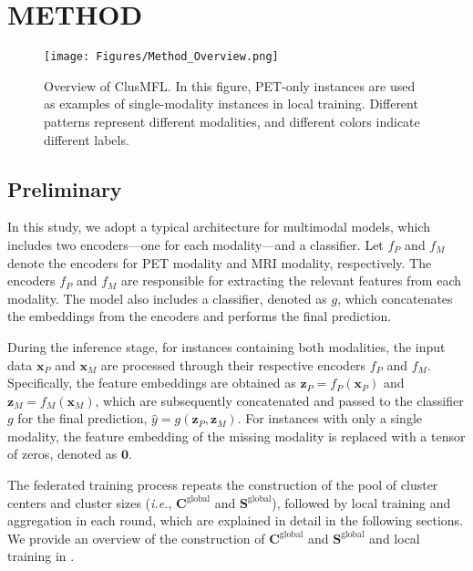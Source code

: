 \section{METHOD}
\begin{figure*}[htbp]
    \centering
    \texttt{[image: Figures/Method\_Overview.png]} %
    \caption{Overview of ClusMFL. In this figure, PET-only instances are used as examples of single-modality instances in local training. Different patterns represent different modalities, and different colors indicate different labels.}  
    \label{fig:overview}
\end{figure*}
\subsection{Preliminary}
\label{sec: preliminary}
In this study, we adopt a typical architecture for multimodal models, which includes two encoders—one for each modality—and a classifier. Let \( f_P \) and \( f_M \) denote the encoders for PET modality and MRI modality, respectively. The encoders \( f_P \) and \( f_M \) are responsible for extracting the relevant features from each modality. The model also includes a classifier, denoted as \( g \), which concatenates the embeddings from the encoders and performs the final prediction.

During the inference stage, for instances containing both modalities, the input data \( \mathbf{x}_P \) and \( \mathbf{x}_M \) are processed through their respective encoders \( f_P \) and \( f_M \). Specifically, the feature embeddings are obtained as \( \mathbf{z}_P = f_P(\mathbf{x}_P) \) and \( \mathbf{z}_M = f_M(\mathbf{x}_M)\), which are subsequently concatenated and passed to the classifier \( g \) for the final prediction, \( \hat{y} = g(\mathbf{z}_P, \mathbf{z}_M) \). For instances with only a single modality, the feature embedding of the missing modality is replaced with a tensor of zeros, denoted as \( \mathbf{0} \). 

The federated training process repeats the construction of the pool of cluster centers and cluster sizes (\textit{i.e.}, \( \mathbf{C}^{\text{global}} \) and \( \mathbf{S}^{\text{global}} \)), followed by local training and aggregation in each round, which are explained in detail in the following sections. We provide an overview of the construction of  \( \mathbf{C}^{\text{global}} \) and \( \mathbf{S}^{\text{global}} \) and local training in .

